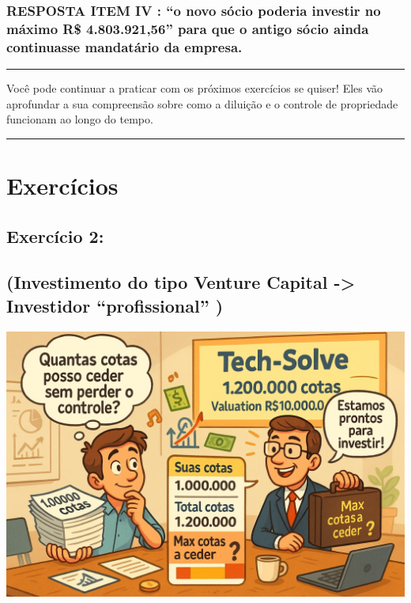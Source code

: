 \documentclass[
]{book}
\begin{document}
\subsubsection{RESPOSTA ITEM IV : ``o novo sócio poderia investir no máximo R\$ 4.803.921,56'' para que o antigo sócio ainda continuasse mandatário da empresa.}\label{resposta-item-iv-o-novo-suxf3cio-poderia-investir-no-muxe1ximo-r-4.803.92156-para-que-o-antigo-suxf3cio-ainda-continuasse-mandatuxe1rio-da-empresa.}

\begin{center}\rule{0.5\linewidth}{0.5pt}\end{center}

Você pode continuar a praticar com os próximos exercícios se quiser! Eles vão aprofundar a sua compreensão sobre como a diluição e o controle de propriedade funcionam ao longo do tempo.

\begin{center}\rule{0.5\linewidth}{0.5pt}\end{center}

\section{Exercícios}\label{exercuxedcios-1}

\subsection{\texorpdfstring{\textbf{Exercício 2:}}{Exercício 2:}}\label{exercuxedcio-2}

\subsection{(Investimento do tipo Venture Capital -\textgreater{} Investidor ``profissional'' )}\label{investimento-do-tipo-venture-capital---investidor-profissional}

\includegraphics[width=7.03125in,height=\textheight]{images/03-2025-08-19_20/exercicio-02.jpg}
\end{document}
